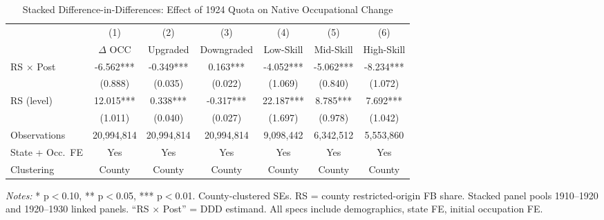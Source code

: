 \begin{table}[H]
\centering
\caption{Stacked Difference-in-Differences: Effect of 1924 Quota on Native Occupational Change}
\begin{threeparttable}
\begin{adjustbox}{max width=\textwidth}
\begin{tabular}{lcccccc}
\toprule
& (1) & (2) & (3) & (4) & (5) & (6) \\
& $\Delta$ OCC & Upgraded & Downgraded & Low-Skill & Mid-Skill & High-Skill \\
\midrule
RS $\times$ Post & -6.562*** & -0.349*** & 0.163*** & -4.052*** & -5.062*** & -8.234*** \\
& (0.888) & (0.035) & (0.022) & (1.069) & (0.840) & (1.072) \\
[0.5em]
RS (level) & 12.015*** & 0.338*** & -0.317*** & 22.187*** & 8.785*** & 7.692*** \\
& (1.011) & (0.040) & (0.027) & (1.697) & (0.978) & (1.042) \\
\midrule
Observations & 20,994,814 & 20,994,814 & 20,994,814 & 9,098,442 & 6,342,512 & 5,553,860 \\
State + Occ.\ FE & Yes & Yes & Yes & Yes & Yes & Yes \\
Clustering & County & County & County & County & County & County \\
\bottomrule
\end{tabular}
\end{adjustbox}
\par\vspace{0.3em}
{\footnotesize \emph{Notes:} * p$<$0.10, ** p$<$0.05, *** p$<$0.01. County-clustered SEs. RS = county restricted-origin FB share. Stacked panel pools 1910--1920 and 1920--1930 linked panels. ``RS $\times$ Post'' = DDD estimand. All specs include demographics, state FE, initial occupation FE.}
\end{threeparttable}
\label{tab:ddd}
\end{table}
